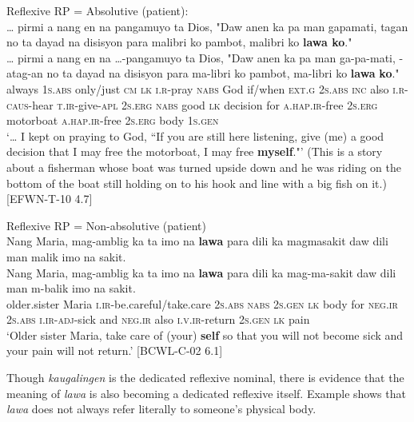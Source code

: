 \ea
Reflexive RP = Absolutive (patient): \\
… pirmi  a  nang  en  na  pangamuyo  ta Dios,  "Daw anen ka  pa  man  gapamati,  tagan  no  ta dayad na disisyon para  malibri  ko  pambot,  malibri  ko  \textbf{lawa ko}."\\\smallskip
\gll … pirmi  a  nang  en  na  …-pangamuyo  ta Dios,  "Daw anen ka  pa  man  ga-pa-mati,  \emptyset{}-atag-an  no  ta dayad na disisyon para  ma-libri  ko  pambot,  ma-libri  ko  \textbf{lawa}  \textbf{ko}." \\
{} always  1\textsc{s.abs}  only/just  \textsc{cm}  \textsc{lk}  \textsc{i.r}-pray  \textsc{nabs}
God  if/when \textsc{ext.g}  2\textsc{s.abs}  \textsc{inc} also  \textsc{i.r}-\textsc{caus}-hear  \textsc{t.ir}-give-\textsc{apl}  2\textsc{s.erg}  \textsc{nabs} good \textsc{lk} decision for \textsc{a.hap.ir}-free  2\textsc{s.erg} motorboat \textsc{a.hap.ir}-free  2\textsc{s.erg} body 1\textsc{s.gen} \\
\glt `… I kept on praying to God, “If you are still here listening, give (me) a good decision that I may free the motorboat, I may free \textbf{myself}."’ (This is a story about a fisherman whose boat was turned upside down and he was riding on the bottom of the boat still holding on to his hook and line with a big fish on it.) [EFWN-T-10 4.7]
\z

\ea
Reflexive RP = Non-absolutive (patient) \\
Nang  Maria,  mag-amblig  ka  ta  imo  na  \textbf{lawa}  para dili  ka  magmasakit  daw  dili  man  malik  imo na  sakit. \\\smallskip
\gll Nang  Maria,  mag-amblig  ka  ta  imo  na  \textbf{lawa} para dili  ka  mag-ma-sakit  daw  dili  man  m-balik  imo na  sakit. \\
older.sister  Maria  \textsc{i.ir}-be.careful/take.care  2\textsc{s.abs}  \textsc{nabs}  2\textsc{s.gen}  \textsc{lk} body  for
\textsc{neg.ir} 2\textsc{s.abs}  \textsc{i.ir}-\textsc{adj}-sick  and  \textsc{neg.ir}  also  \textsc{i.v.ir}-return 2\textsc{s.gen}  \textsc{lk}  pain \\
\glt `Older sister Maria, take care of (your) \textbf{self} so that you will not become sick and your pain will not return.’ [BCWL-C-02 6.1]
\z

Though \textit{kaugalingen} is the dedicated reflexive nominal, there is evidence that the meaning of \textit{lawa} is also becoming a dedicated reflexive itself. Example  shows that \textit{lawa} does not always refer literally to someone’s physical body.

